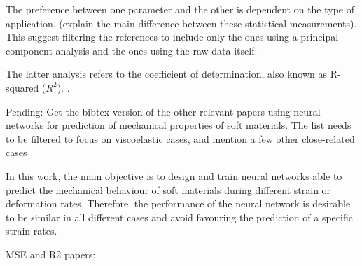 The preference between one parameter and the other is dependent on the type of application. (explain the main difference between these statistical measurements). This suggest filtering the references to include only the ones using a principal component analysis and the ones using the raw data itself.

The latter analysis refers to the coefficient of determination, also known as R-squared ($R^2$). \cite{aulova2017determination,tho2004artificial,saha2018use,setti2014artificial,xu2019application}. 

Pending: Get the bibtex version of the other relevant papers using neural networks for prediction of mechanical properties of soft materials. The list needs to be filtered to focus on viscoelastic cases, and mention a few other close-related cases

In this work, the main objective is to design and train neural networks able to predict the mechanical behaviour of soft materials during different strain or deformation rates. Therefore, the performance of the neural network is desirable to be similar in all different cases and avoid favouring the prediction of a specific strain rates.



MSE and R2 papers:


